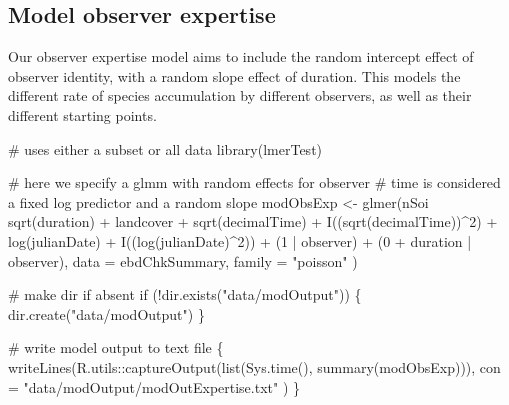 \documentclass[]{article}
\newenvironment{Shaded}{}{}
\newcommand{\CommentTok}[1]{\textcolor[rgb]{0.00,0.50,0.00}{#1}}
\newcommand{\ControlFlowTok}[1]{\textcolor[rgb]{0.00,0.00,1.00}{#1}}
\newcommand{\DataTypeTok}[1]{#1}
\newcommand{\DecValTok}[1]{#1}
\newcommand{\KeywordTok}[1]{\textcolor[rgb]{0.00,0.00,1.00}{#1}}
\newcommand{\NormalTok}[1]{#1}
\newcommand{\OperatorTok}[1]{#1}
\newcommand{\StringTok}[1]{\textcolor[rgb]{0.00,0.50,0.50}{#1}}
\begin{document}
\hypertarget{model-observer-expertise}{%
\subsection{Model observer expertise}\label{model-observer-expertise}}

Our observer expertise model aims to include the random intercept effect of observer identity, with a random slope effect of duration. This models the different rate of species accumulation by different observers, as well as their different starting points.

\begin{Shaded}
\begin{Highlighting}[]
\CommentTok{# uses either a subset or all data}
\KeywordTok{library}\NormalTok{(lmerTest)}

\CommentTok{# here we specify a glmm with random effects for observer}
\CommentTok{# time is considered a fixed log predictor and a random slope}
\NormalTok{modObsExp <-}\StringTok{ }\KeywordTok{glmer}\NormalTok{(nSoi }\OperatorTok{~}\StringTok{ }\KeywordTok{sqrt}\NormalTok{(duration) }\OperatorTok{+}
\StringTok{  }\NormalTok{landcover }\OperatorTok{+}
\StringTok{  }\KeywordTok{sqrt}\NormalTok{(decimalTime) }\OperatorTok{+}
\StringTok{  }\KeywordTok{I}\NormalTok{((}\KeywordTok{sqrt}\NormalTok{(decimalTime))}\OperatorTok{^}\DecValTok{2}\NormalTok{) }\OperatorTok{+}
\StringTok{  }\KeywordTok{log}\NormalTok{(julianDate) }\OperatorTok{+}
\StringTok{  }\KeywordTok{I}\NormalTok{((}\KeywordTok{log}\NormalTok{(julianDate)}\OperatorTok{^}\DecValTok{2}\NormalTok{)) }\OperatorTok{+}
\StringTok{  }\NormalTok{(}\DecValTok{1} \OperatorTok{|}\StringTok{ }\NormalTok{observer) }\OperatorTok{+}\StringTok{ }\NormalTok{(}\DecValTok{0} \OperatorTok{+}\StringTok{ }\NormalTok{duration }\OperatorTok{|}\StringTok{ }\NormalTok{observer),}
\DataTypeTok{data =}\NormalTok{ ebdChkSummary, }\DataTypeTok{family =} \StringTok{"poisson"}
\NormalTok{)}
\end{Highlighting}
\end{Shaded}

\begin{Shaded}
\begin{Highlighting}[]
\CommentTok{# make dir if absent}
\ControlFlowTok{if}\NormalTok{ (}\OperatorTok{!}\KeywordTok{dir.exists}\NormalTok{(}\StringTok{"data/modOutput"}\NormalTok{)) \{}
  \KeywordTok{dir.create}\NormalTok{(}\StringTok{"data/modOutput"}\NormalTok{)}
\NormalTok{\}}

\CommentTok{# write model output to text file}
\NormalTok{\{}
  \KeywordTok{writeLines}\NormalTok{(R.utils}\OperatorTok{::}\KeywordTok{captureOutput}\NormalTok{(}\KeywordTok{list}\NormalTok{(}\KeywordTok{Sys.time}\NormalTok{(), }\KeywordTok{summary}\NormalTok{(modObsExp))),}
    \DataTypeTok{con =} \StringTok{"data/modOutput/modOutExpertise.txt"}
\NormalTok{  )}
\NormalTok{\}}
\end{Highlighting}
\end{Shaded}
\end{document}
